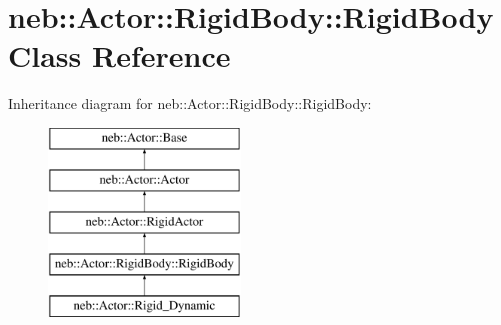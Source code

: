 \hypertarget{classneb_1_1Actor_1_1RigidBody_1_1RigidBody}{\section{neb\-:\-:\-Actor\-:\-:\-Rigid\-Body\-:\-:\-Rigid\-Body \-Class \-Reference}
\label{classneb_1_1Actor_1_1RigidBody_1_1RigidBody}
}
\-Inheritance diagram for neb\-:\-:\-Actor\-:\-:\-Rigid\-Body\-:\-:\-Rigid\-Body\-:\begin{figure}[H]
\begin{center}
\leavevmode
\includegraphics[height=5.000000cm]{classneb_1_1Actor_1_1RigidBody_1_1RigidBody}
\end{center}
\end{figure}
